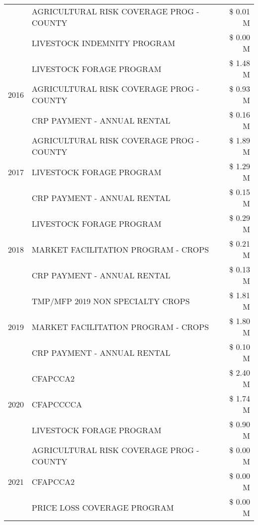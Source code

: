 \begin{tabular}{llr}
 & AGRICULTURAL RISK COVERAGE PROG - COUNTY & \$ 0.01 M \\
 & LIVESTOCK INDEMNITY PROGRAM & \$ 0.00 M \\
\cline{1-3}
\multirow[t]{3}{*}{2016} & LIVESTOCK FORAGE PROGRAM                      & \$ 1.48 M \\
 & AGRICULTURAL RISK COVERAGE PROG - COUNTY      & \$ 0.93 M \\
 & CRP PAYMENT - ANNUAL RENTAL                   & \$ 0.16 M \\
\cline{1-3}
\multirow[t]{3}{*}{2017} & AGRICULTURAL RISK COVERAGE PROG - COUNTY & \$ 1.89 M \\
 & LIVESTOCK FORAGE PROGRAM & \$ 1.29 M \\
 & CRP PAYMENT - ANNUAL RENTAL & \$ 0.15 M \\
\cline{1-3}
\multirow[t]{3}{*}{2018} & LIVESTOCK FORAGE PROGRAM & \$ 0.29 M \\
 & MARKET FACILITATION PROGRAM - CROPS & \$ 0.21 M \\
 & CRP PAYMENT - ANNUAL RENTAL & \$ 0.13 M \\
\cline{1-3}
\multirow[t]{3}{*}{2019} & TMP/MFP 2019 NON SPECIALTY CROPS & \$ 1.81 M \\
 & MARKET FACILITATION PROGRAM - CROPS & \$ 1.80 M \\
 & CRP PAYMENT - ANNUAL RENTAL & \$ 0.10 M \\
\cline{1-3}
\multirow[t]{3}{*}{2020} & CFAPCCA2 & \$ 2.40 M \\
 & CFAPCCCCA & \$ 1.74 M \\
 & LIVESTOCK FORAGE PROGRAM & \$ 0.90 M \\
\cline{1-3}
\multirow[t]{3}{*}{2021} & AGRICULTURAL RISK COVERAGE PROG - COUNTY & \$ 0.00 M \\
 & CFAPCCA2 & \$ 0.00 M \\
 & PRICE LOSS COVERAGE PROGRAM & \$ 0.00 M \\
\cline{1-3}
\bottomrule
\end{tabular}
